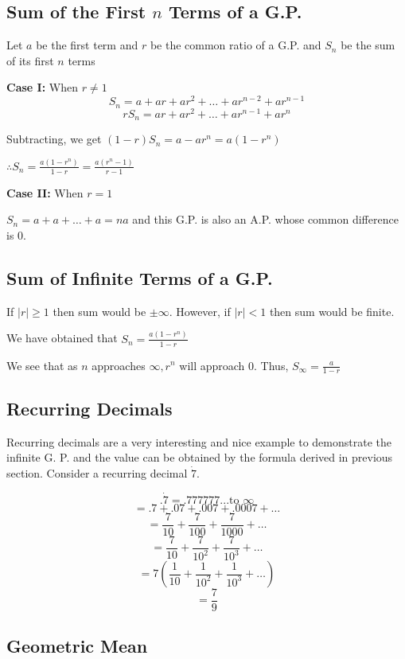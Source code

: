 \subsection{Sum of the First $n$ Terms of a G.P.}
Let $a$ be the first term and $r$ be the common ratio of a G.P. and $S_n$ be the sum of its first $n$ terms

\textbf{Case I:} When $r\neq 1$
$$S_n = a + ar + ar^2 + \ldots + ar^{n - 2} + ar^{n - 1}$$
$$rS_n = ar + ar^2 + \ldots + ar^{n - 1} + ar^n$$

Subtracting, we get $(1 - r)S_n = a - ar^n = a(1 - r^n)$

$\therefore S_n = \frac{a(1 - r^n)}{1 - r} = \frac{a(r^n - 1)}{r - 1}$

\textbf{Case II:} When $r = 1$

$S_n = a + a + \ldots + a = na$ and this G.P. is also an A.P. whose common difference is $0$.

\subsection{Sum of Infinite Terms of a G.P.}
If $|r|\geq 1$ then sum would be $\pm\infty$. However, if $|r|< 1$ then sum would be finite.

We have obtained that $S_n = \frac{a(1 - r^n)}{1 - r}$

We see that as $n$ approaches $\infty, r^n$ will approach $0$. Thus, $S_\infty = \frac{a}{1 - r}$

\subsection{Recurring Decimals}
Recurring decimals are a very interesting and nice example to demonstrate the infinite G. P. and the value can be obtained by the
formula derived in previous section. Consider a recurring decimal $\dot{7}$.

$$.\dot{7} = .777777 ... \text{to }\infty$$
$$= .7 + .07 + .007 + .0007 + \ldots$$
$$= \frac{7}{10} + \frac{7}{100} + \frac{7}{1000} + \ldots$$
$$= \frac{7}{10} + \frac{7}{10^2} + \frac{7}{10^3} + \ldots$$
$$= 7\left(\frac{1}{10} + \frac{1}{10^2} + \frac{1}{10^3} + \ldots\right)$$
$$= \frac{7}{9}$$

\subsection{Geometric Mean}
